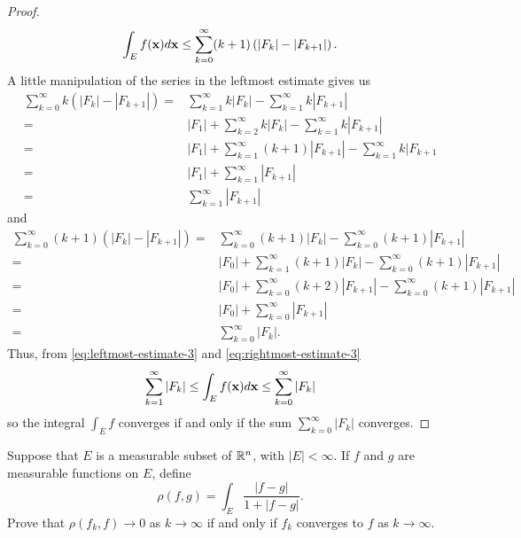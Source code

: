 \begin{proof}
\begin{equation}
\int_E f(\mathbf{x}) d \mathbf{x}\leq
\sum_{k=0}^\infty (k+1)\left(|F_k|-|F_{k+1}|\right).
\end{equation}
A little manipulation of the series in the leftmost estimate gives us
\begin{equation}
\label{eq:leftmost-estimate-3}
\begin{aligned}
\sum_{k=0}^\infty k\left(|F_k|-|F_{k+1}|\right)
={}&\sum_{k=1}^\infty k|F_k|-\sum_{k=1}^\infty k|F_{k+1}|\\
={}&|F_1|+\sum_{k=2}^\infty k|F_k|-\sum_{k=1}^\infty k|F_{k+1}|\\
={}&|F_1|+\sum_{k=1}^\infty(k+1)|F_{k+1}|-\sum_{k=1}^\infty k|F_{k+1}\\
={}&|F_1|+\sum_{k=1}^\infty |F_{k+1}|\\
={}&\sum_{k=1}^\infty|F_{k+1}|
\end{aligned}
\end{equation}
and
\begin{equation}
\label{eq:rightmost-estimate-3}
\begin{aligned}
\sum_{k=0}^\infty(k+1)\left(|F_k|-|F_{k+1}|\right)
={}&\sum_{k=0}^\infty(k+1)|F_k|-\sum_{k=0}^\infty(k+1)|F_{k+1}|\\
={}&|F_0|+\sum_{k=1}^\infty(k+1)|F_k|-\sum_{k=0}^\infty(k+1)|F_{k+1}|\\
={}&|F_0|+\sum_{k=0}^\infty(k+2)|F_{k+1}|-\sum_{k=0}^\infty(k+1)|F_{k+1}|\\
={}&|F_0|+\sum_{k=0}^\infty|F_{k+1}|\\
={}&\sum_{k=0}^\infty|F_k|.
\end{aligned}
\end{equation}
Thus, from \eqref{eq:leftmost-estimate-3} and
\eqref{eq:rightmost-estimate-3}
\begin{equation}
\label{eq:final-upper-lower-estimates-3}
\sum_{k=1}^\infty|F_k|\leq\int_E f(\mathbf{x}) d \mathbf{x}\leq\sum_{k=0}^\infty|F_k|
\end{equation}
so the integral $\int_E f$ converges if and only if the sum
$\sum_{k=0}^\infty|F_k|$ converges.
\end{proof}
\begin{problem}
Suppose that $E$ is a measurable subset of $\mathbb{R}^n$, with
$|E|<\infty$. If $f$ and $g$ are measurable functions on
$E$, define
\[
\rho(f,g)=\int_E\frac{|f-g|}{1+|f-g|}.
\]
Prove that $\rho(f_k,f)\to 0$ as $k\to\infty$ if and only if $f_k$
converges to $f$ as $k\to\infty$.
\end{problem}
